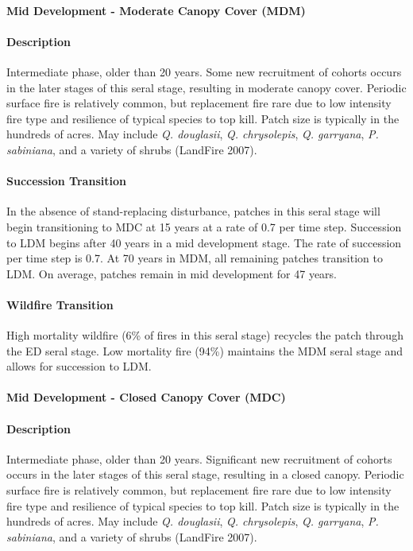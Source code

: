 \noindent\hrulefill

\paragraph*{Mid Development - Moderate Canopy Cover (MDM)}

\paragraph*{Description} Intermediate phase, older than 20 years. Some new recruitment of cohorts occurs in the later stages of this seral stage, resulting in moderate canopy cover. Periodic surface fire is relatively common, but replacement fire rare due to low intensity fire type and resilience of typical species to top kill. Patch size is typically in the hundreds of acres. May include \emph{Q. douglasii}, \emph{Q. chrysolepis}, \emph{Q. garryana}, \emph{P. sabiniana}, and a variety of shrubs (LandFire 2007).

\paragraph*{Succession Transition} In the absence of stand-replacing disturbance, patches in this seral stage will begin transitioning to MDC at 15 years at a rate of 0.7 per time step. Succession to LDM begins after 40 years in a mid development stage. The rate of succession per time step is 0.7. At 70 years in MDM, all remaining patches transition to LDM. On average, patches remain in mid development for 47 years.

\paragraph*{Wildfire Transition} High mortality wildfire (6\% of fires in this seral stage) recycles the patch through the ED seral stage. Low mortality fire (94\%) maintains the MDM seral stage and allows for succession to LDM.

\noindent\hrulefill

\paragraph*{Mid Development - Closed Canopy Cover (MDC)}

\paragraph*{Description} Intermediate phase, older than 20 years. Significant new recruitment of cohorts occurs in the later stages of this seral stage, resulting in a closed canopy. Periodic surface fire is relatively common, but replacement fire rare due to low intensity fire type and resilience of typical species to top kill. Patch size is typically in the hundreds of acres. May include \emph{Q. douglasii}, \emph{Q. chrysolepis}, \emph{Q. garryana}, \emph{P. sabiniana}, and a variety of shrubs (LandFire 2007).

